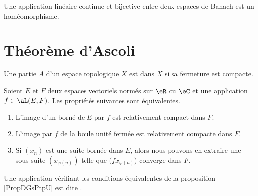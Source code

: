 
\begin{theorem}  \label{ThofQShsw}
    Une application linéaire continue et bijective entre deux espaces de Banach est un homéomorphisme.
\end{theorem}

\section{Théorème d'Ascoli}

\begin{definition}
    Une partie \( A\) d'un espace topologique \( X\) est  dans \( X\) si sa fermeture est compacte.
\end{definition}

\begin{proposition} \label{PropDGsPtpU}
    Soient \( E\) et \( F\) deux espaces vectoriels normés sur \( \eR\) ou \( \eC\) et une application \( f\in\aL(E,F)\). Les propriétés suivantes sont équivalentes.
    \begin{enumerate}
        \item
            L'image d'un borné de \( E\) par \( f\) est relativement compact dans \( F\).
        \item   \label{ItemJIkpUbLii}
            L'image par \( f\) de la boule unité fermée est relativement compacte dans \( F\).
        \item
            Si \( (x_n)\) est une suite bornée dans \( E\), alors nous pouvons en extraire une sous-suite \( (x_{\varphi(n)})\) telle que \( \big( fx_{\varphi(n)} \big)\) converge dans \( F\).
    \end{enumerate}
\end{proposition}

\begin{definition}
    Une application vérifiant les conditions équivalentes de la proposition \ref{PropDGsPtpU} est dite .
\end{definition}

